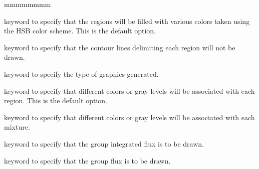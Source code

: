\begin{GuideUpdate}{3.04}
\begin{ListeDeDescription}{mmmmmmmm}
\item[\moc{HSB}] keyword to specify that the regions will be filled with various colors taken
using the HSB color scheme. This is the default option.                                                      

\item[\moc{NOCONTOUR}] keyword to specify that the contour lines delimiting each region will not be drawn.

\item[\moc{TYPE}] keyword to specify the type of graphics generated.

\item[\moc{REGION}] keyword to specify that different colors or gray levels will be associated with each
region. This is the default option.


\item[\moc{MIXTURE}] keyword to specify that different colors or gray levels will be associated with each
mixture.

\item[\moc{FLUX}] keyword to specify that the group integrated flux is to be drawn.

\item[\moc{MGFLUX}] keyword to specify that the group flux is to be drawn.

\end{ListeDeDescription}
   
\end{GuideUpdate}
\eject
